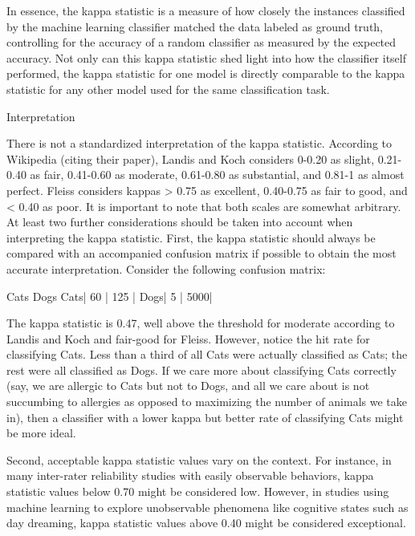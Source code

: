 \documentclass[caret-main.tex]{subfiles}
\begin{document}
In essence, the kappa statistic is a measure of how closely the instances classified by the machine learning classifier matched the data labeled as ground truth, controlling for the accuracy of a random classifier as measured by the expected accuracy. Not only can this kappa statistic shed light into how the classifier itself performed, the kappa statistic for one model is directly comparable to the kappa statistic for any other model used for the same classification task.

Interpretation

There is not a standardized interpretation of the kappa statistic. According to Wikipedia (citing their paper), Landis and Koch considers 0-0.20 as slight, 0.21-0.40 as fair, 0.41-0.60 as moderate, 0.61-0.80 as substantial, and 0.81-1 as almost perfect. Fleiss considers kappas > 0.75 as excellent, 0.40-0.75 as fair to good, and < 0.40 as poor. It is important to note that both scales are somewhat arbitrary. At least two further considerations should be taken into account when interpreting the kappa statistic. First, the kappa statistic should always be compared with an accompanied confusion matrix if possible to obtain the most accurate interpretation. Consider the following confusion matrix:

     Cats Dogs
Cats| 60 | 125 |
Dogs| 5  | 5000|

The kappa statistic is 0.47, well above the threshold for moderate according to Landis and Koch and fair-good for Fleiss. However, notice the hit rate for classifying Cats. Less than a third of all Cats were actually classified as Cats; the rest were all classified as Dogs. If we care more about classifying Cats correctly (say, we are allergic to Cats but not to Dogs, and all we care about is not succumbing to allergies as opposed to maximizing the number of animals we take in), then a classifier with a lower kappa but better rate of classifying Cats might be more ideal.

Second, acceptable kappa statistic values vary on the context. For instance, in many inter-rater reliability studies with easily observable behaviors, kappa statistic values below 0.70 might be considered low. However, in studies using machine learning to explore unobservable phenomena like cognitive states such as day dreaming, kappa statistic values above 0.40 might be considered exceptional.
\end{document}
